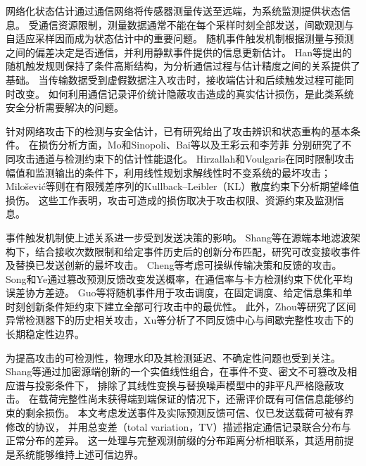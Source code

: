 网络化状态估计通过通信网络将传感器测量传送至远端，为系统监测提供状态信息。
受通信资源限制，测量数据通常不能在每个采样时刻全部发送，间歇观测与自适应采样因而成为状态估计中的重要问题\cite{sinopoli2004,rabi2012}。
随机事件触发机制根据测量与预测之间的偏差决定是否通信，并利用静默事件提供的信息更新估计。
Han等\cite{han2015}提出的随机触发规则保持了条件高斯结构，为分析通信过程与估计精度之间的关系提供了基础。
当传输数据受到虚假数据注入攻击时，接收端估计和后续触发过程可能同时改变。
如何利用通信记录评价统计隐蔽攻击造成的真实估计损伤，是此类系统安全分析需要解决的问题。

针对网络攻击下的检测与安全估计，已有研究给出了攻击辨识和状态重构的基本条件\cite{pasqualetti2013,fawzi2014}。
在损伤分析方面，Mo和Sinopoli\cite{mo2016}、Bai等\cite{bai2017,baisensors2017}以及王彩云和李芳菲\cite{targetwang2021}
分别研究了不同攻击通道与检测约束下的估计性能退化。
Hirzallah和Voulgaris\cite{hirzallah2018}在同时限制攻击幅值和监测输出的条件下，利用线性规划求解线性时不变系统的最坏攻击；
Milo\v{s}evi\'{c}等\cite{milosevic2020}则在有限残差序列的Kullback--Leibler（KL）散度约束下分析期望峰值损伤。
这些工作表明，攻击可造成的损伤取决于攻击权限、资源约束及监测信息。

事件触发机制使上述关系进一步受到发送决策的影响。
Shang等\cite{shang2022}在源端本地滤波架构下，结合接收次数限制和给定事件历史后的创新分布匹配，研究可改变接收事件及替换已发送创新的最坏攻击。
Cheng等\cite{cheng2020}考虑可操纵传输决策和反馈的攻击。
Song和Ye\cite{Paper_Song2022_SEBScheduling}通过篡改预测反馈改变发送概率，在通信率与卡方检测约束下优化平均误差协方差迹。
Guo等\cite{guo2025}将随机事件用于攻击调度，在固定调度、给定信息集和单时刻创新条件矩约束下建立全部可行攻击中的最优性。
此外，Zhou等\cite{zhou2023}研究了区间异常检测器下的历史相关攻击，Xu等\cite{xu2026}分析了不同反馈中心与间歇完整性攻击下的长期稳定性边界。

为提高攻击的可检测性，物理水印及其检测延迟、不确定性问题也受到关注\cite{mo2015,naha2023,targetchen2025}。
Shang等\cite{Paper_Shang2026_SingleDimensional}通过加密源端创新的一个实值线性组合，在事件不变、密文不可篡改及相应谱与投影条件下，
排除了其线性变换与替换噪声模型中的非平凡严格隐蔽攻击。
在载荷完整性尚未获得端到端保证的情况下，还需评价既有可信信息能够约束的剩余损伤。
本文考虑发送事件及实际预测反馈可信、仅已发送载荷可被有界修改的协议，
并用总变差（total variation，TV）描述指定通信记录联合分布与正常分布的差异。
这一处理与完整观测前缀的分布距离分析相联系\cite{khazraei2022perception}，其适用前提是系统能够维持上述可信边界。

